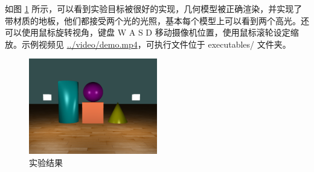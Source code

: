 \documentclass[math-font=newcm]{sjtuarticle}
\providecommand{\linkcode}[1]{\href{run:../source/#1}{#1}}
\begin{document}
如图 \ref{fig:result} 所示，可以看到实验目标被很好的实现，几何模型被正确渲染，并实现了带材质的地板，他们都接受两个光的光照，基本每个模型上可以看到两个高光。还可以使用鼠标旋转视角，键盘 W A S D 移动摄像机位置，使用鼠标滚轮设定缩放。示例视频见 \linkcode{../video/demo.mp4}，可执行文件位于 executables/ 文件夹。

\begin{figure}[h]
    \centering
    \includegraphics[width=0.5\textwidth]{result.png}
    \caption{实验结果}
    \label{fig:result}
\end{figure}

\printbibliography
\end{document}
